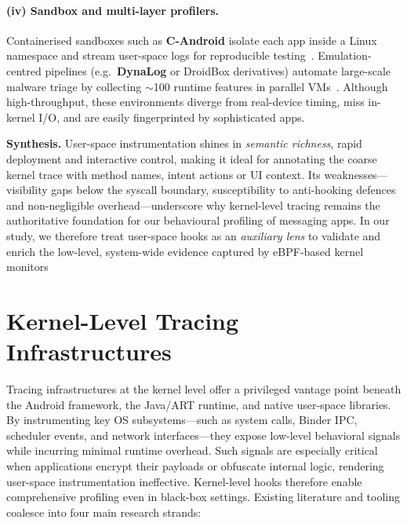 \documentclass[a4paper,12pt]{report}
\begin{document}
\paragraph{(iv) Sandbox and multi-layer profilers.}
Containerised sandboxes such as \textbf{C-Android} isolate each app inside a
Linux namespace and stream user-space logs for reproducible
testing~\cite{candroid2019}.  Emulation-centred pipelines (e.g.\ \textbf{DynaLog}
or DroidBox derivatives) automate large-scale malware triage by collecting
$\sim$100 runtime features in parallel VMs~\cite{dynalog2016}.  Although
high-throughput, these environments diverge from real-device timing,
miss in-kernel I/O, and are easily fingerprinted by sophisticated apps.

\medskip
\noindent\textbf{Synthesis.}
User-space instrumentation shines in \emph{semantic richness}, rapid
deployment and interactive control, making it ideal for annotating the coarse
kernel trace with method names, intent actions or UI context.  Its
weaknesses—visibility gaps below the syscall boundary, susceptibility to
anti-hooking defences and non-negligible overhead—underscore why kernel-level
tracing remains the authoritative foundation for our behavioural profiling of
messaging apps.  In our study, we therefore treat user-space hooks as an
\emph{auxiliary lens} to validate and enrich the low-level, system-wide evidence
captured by eBPF-based kernel monitors



\section{Kernel-Level Tracing Infrastructures}
\label{sec:tracing-infra}

Tracing infrastructures at the kernel level offer a privileged vantage point beneath the Android framework, the Java/ART runtime, and native user-space libraries. By instrumenting key OS subsystems—such as system calls, Binder IPC, scheduler events, and network interfaces—they expose low-level behavioral signals while incurring minimal runtime overhead. Such signals are especially critical when applications encrypt their payloads or obfuscate internal logic, rendering user-space instrumentation ineffective. Kernel-level hooks therefore enable comprehensive profiling even in black-box settings. Existing literature and tooling coalesce into four main research strands:
\end{document}

